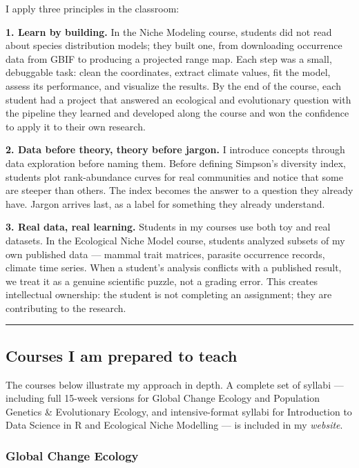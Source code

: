 \documentclass[11pt,letterpaper]{article}
\begin{document}
I apply three principles in the classroom:

\textbf{1. Learn by building.} In the Niche Modeling course, students did not read about species distribution models; they built one, from downloading occurrence data from GBIF to producing a projected range map. Each step was a small, debuggable task:
clean the coordinates, extract climate values, fit the model, assess its performance, and visualize the results. By the end of the course, each student had a project that answered an ecological and evolutionary question with the pipeline they learned and developed along the course and won the confidence to apply it to their own
research.

\textbf{2. Data before theory, theory before jargon.} I introduce
concepts through data exploration before naming them. Before defining
Simpson's diversity index, students plot rank-abundance curves for real
communities and notice that some are steeper than others. The index
becomes the answer to a question they already have. Jargon arrives last,
as a label for something they already understand.

\textbf{3. Real data, real learning.} Students in my courses use both toy and real datasets. In the Ecological Niche Model course, students analyzed subsets of my own published data --- mammal trait matrices,
parasite occurrence records, climate time series. When a student's
analysis conflicts with a published result, we treat it as a genuine
scientific puzzle, not a grading error. This creates intellectual
ownership: the student is not completing an assignment; they are
contributing to the research.

\begin{center}\rule{0.5\linewidth}{0.5pt}\end{center}

\subsection*{Courses I am prepared to
teach}\label{courses-i-am-prepared-to-teach}

The courses below illustrate my approach in depth. A complete set of
syllabi --- including full 15-week versions for Global Change Ecology
and Population Genetics \& Evolutionary Ecology, and intensive-format
syllabi for Introduction to Data Science in R and Ecological Niche
Modelling --- is included in my  \emph{website}.

\subsubsection*{Global Change Ecology}\label{global-change-ecology-new-course-my-design}
\end{document}
